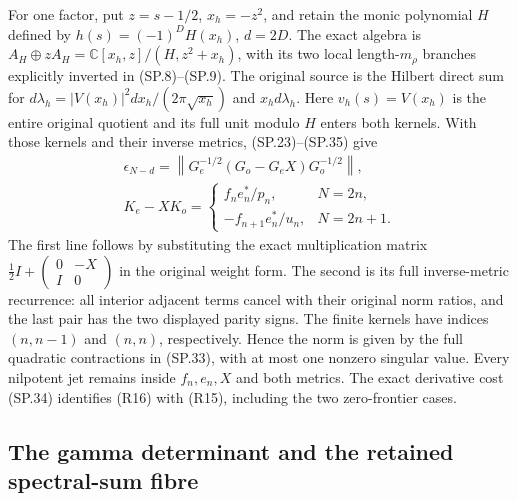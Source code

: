 For one factor, put \(z=s-1/2\), \(x_h=-z^2\), and retain the
monic polynomial \(H\) defined by \(h(s)=(-1)^DH(x_h)\),
\(d=2D\). The exact algebra is
\(A_H\oplus zA_H=\mathbb C[x_h,z]/(H,z^2+x_h)\), with its
two local length-\(m_\rho\) branches explicitly inverted in
(SP.8)--(SP.9). The original source is the Hilbert direct sum for
\(d\lambda_h=|V(x_h)|^2dx_h/(2\pi\sqrt{x_h})\) and
\(x_h d\lambda_h\). Here \(v_h(s)=V(x_h)\) is the entire
original quotient and its full unit modulo \(H\) enters both
kernels. With those kernels and their inverse metrics, (SP.23)--(SP.35)
give
\[
 \begin{gathered}
 \epsilon_{N-d}=
  \left\|G_e^{-1/2}(G_o-G_eX)G_o^{-1/2}\right\|,\\
 K_e-XK_o=
 \begin{cases}f_ne_n^*/p_n,&N=2n,\\
              -f_{n+1}e_n^*/u_n,&N=2n+1.
 \end{cases}
 \end{gathered}
 \tag{R16}
\]
The first line follows by substituting the exact multiplication
matrix \(\frac12I+\left(\begin{smallmatrix}0&-X\\I&0\end{smallmatrix}\right)\)
in the original weight form. The second is its full inverse-metric
recurrence: all interior adjacent terms cancel with their original
norm ratios, and the last pair has the two displayed parity signs.
The finite kernels have indices \((n,n-1)\) and \((n,n)\),
respectively. Hence the norm is given by the full quadratic
contractions in (SP.33), with at most one nonzero singular value.
Every nilpotent jet remains inside \(f_n,e_n,X\) and both metrics.
The exact derivative cost (SP.34) identifies (R16) with (R15),
including the two zero-frontier cases.

\subsection{The gamma determinant and the retained spectral-sum fibre}

